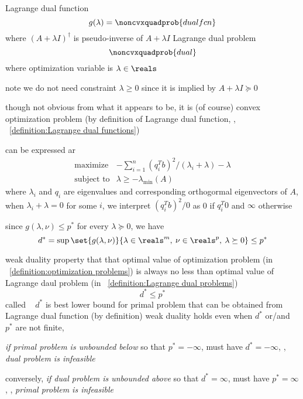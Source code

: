 \documentclass[17pt,landscape]{foils}
\begin{document}
{\vitem
	Lagrange dual function
	$$
		g(\lambda)
		=
		\noncvxquadprob{dual fcn}
	$$
	where $(A+\lambda I)^\dagger$ is pseudo-inverse of $A+\lambda I$
\vitem
	Lagrange dual problem%
	$$
		\noncvxquadprob{dual}
	$$
	where optimization variable is $\lambda \in\reals$
	\bit
	\item
		note we do not need constraint $\lambda \geq0$
		since it is implied by $A+\lambda I \succeq 0$
	\item
		though not obvious from what it appears to be,
		it is (of course) convex optimization problem
		(by definition of Lagrange dual function, \ie, ~\ref{definition:Lagrange dual functions})
	\item
		can be expressed ar
		$$
			\begin{array}{ll}
				\mbox{maximize} &
					-\sum_{i=1}^n (q_i^Tb)^2/(\lambda_i + \lambda) - \lambda
				\\
				\mbox{subject to} &
					\lambda \geq - \lambda_\mathrm{min}(A)
			\end{array}
		$$
		where $\lambda_i$ and $q_i$ are eigenvalues and corresponding orthogormal eigenvectors of $A$,
		when $\lambda_i + \lambda=0$ for some $i$,
		we interpret $(q_i^Tb)^2/0$ as 0 if $q_i^T0$ and $\infty$ otherwise
	\eit
\eit



\bit
\item
	since $g(\lambda,\nu)\leq p^\ast$ for every $\lambda\succeq 0$,
	we have
	$$
		d^\ast = \sup\set{g(\lambda,\nu)}{\lambda\in\reals^m,\:\nu\in\reals^p,\:\lambda\succeq 0}
		\leq
		p^\ast
	$$
\eit
\begin{mydefinition}{weak duality}
	property that
	that
	optimal value of optimization problem (in ~\ref{definition:optimization problems})
	is always no less than
	optimal value of Lagrange daul problem (in ~\ref{definition:Lagrange dual problems})
	$$
		d^\ast \leq p^\ast
	$$
	called 
	\shrinkspacewithintheoremslike\
	\ibit
	\iitem
		$d^\ast$ is best lower bound for primal problem
		that can be obtained from Lagrange dual function (by definition)
	\iitem
		weak duality holds even when $d^\ast$ or/and $p^\ast$ are not finite, \eg\
		\bit
		\item
			\emph{if primal problem is unbounded below} so that $p^\ast=-\infty$,
			must have $d^\ast = -\infty$,
			\ie, \emph{dual problem is infeasible}\
		\item
			conversely,
			\emph{if dual problem is unbounded above} so that $d^\ast = \infty$,
			must have $p^\ast=\infty$,
			\ie, \emph{primal problem is infeasible}\
		\eit
	\eit
\end{mydefinition}


}
\end{document}
